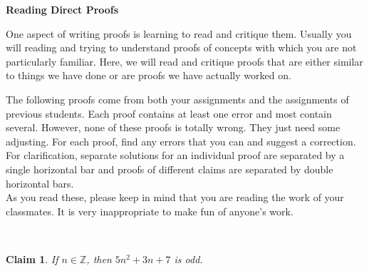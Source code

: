 \documentclass[12 pt]{article}
\newcommand{\Z}{\mathbb{Z}}
\theoremstyle{definition}
\theoremstyle{plain}
\theoremstyle{mytheorem}
\newtheorem{claim}{Claim}
\theoremstyle{myexample}
\theoremstyle{mydefinition}
\begin{document}
\begin{center}
\textbf{Reading Direct Proofs}
\end{center}

One aspect of writing proofs is learning to read and critique them.  Usually you will reading and trying to understand proofs of concepts with which you are not particularly familiar.  Here, we will read and critique proofs that are either similar to things we have done or are proofs we have actually worked on.

\begin{center}
\end{center}

\noindent The following proofs come from both your assignments and the assignments of previous students.  Each proof contains at least one error and most contain several.  However, none of these proofs is totally wrong.  They just need some adjusting.  For each proof, find any errors that you can and suggest a correction.\\

For clarification, separate solutions for an individual proof are separated by a single horizontal bar and proofs of different claims are separated by double horizontal bars.\\

As you read these, please keep in mind that you are reading the work of your classmates.  It is very inappropriate to make fun of anyone's work.

\newpage

\begin{center} \underline{\hspace{\textwidth}}\\ \underline{\hspace{\textwidth}} \end{center}

\begin{claim}
If $n \in \Z$, then $5n^2+3n+7$ is odd.
\end{claim}
\end{document}
